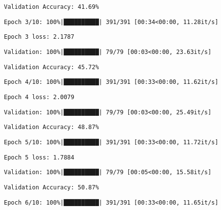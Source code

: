 \documentclass[
  letterpaper,
  DIV=11,
  numbers=noendperiod]{scrreprt}
\begin{document}
\begin{verbatim}
Validation Accuracy: 41.69%
\end{verbatim}

\begin{verbatim}
Epoch 3/10: 100%|██████████| 391/391 [00:34<00:00, 11.28it/s]
\end{verbatim}

\begin{verbatim}
Epoch 3 loss: 2.1787
\end{verbatim}

\begin{verbatim}
Validation: 100%|██████████| 79/79 [00:03<00:00, 23.63it/s]
\end{verbatim}

\begin{verbatim}
Validation Accuracy: 45.72%
\end{verbatim}

\begin{verbatim}
Epoch 4/10: 100%|██████████| 391/391 [00:33<00:00, 11.62it/s]
\end{verbatim}

\begin{verbatim}
Epoch 4 loss: 2.0079
\end{verbatim}

\begin{verbatim}
Validation: 100%|██████████| 79/79 [00:03<00:00, 25.49it/s]
\end{verbatim}

\begin{verbatim}
Validation Accuracy: 48.87%
\end{verbatim}

\begin{verbatim}
Epoch 5/10: 100%|██████████| 391/391 [00:33<00:00, 11.72it/s]
\end{verbatim}

\begin{verbatim}
Epoch 5 loss: 1.7884
\end{verbatim}

\begin{verbatim}
Validation: 100%|██████████| 79/79 [00:05<00:00, 15.58it/s]
\end{verbatim}

\begin{verbatim}
Validation Accuracy: 50.87%
\end{verbatim}

\begin{verbatim}
Epoch 6/10: 100%|██████████| 391/391 [00:33<00:00, 11.65it/s]
\end{verbatim}
\end{document}
